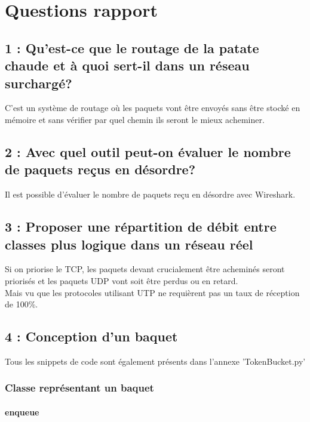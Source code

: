 \documentclass{article}
\begin{document}
\section{Questions rapport}

\subsection*{1 : Qu'est-ce que le routage de la patate chaude et à quoi sert-il dans un réseau surchargé?}

C'est un système de routage où les paquets vont être envoyés sans être stocké en mémoire et sans vérifier par quel chemin ils seront le mieux acheminer. \cite{HotPotato}

\subsection*{2 : Avec quel outil peut-on évaluer le nombre de paquets reçus en désordre?}

Il est possible d'évaluer le nombre de paquets reçu en désordre avec Wireshark.


\subsection*{3 : Proposer une répartition de débit entre classes plus logique dans un réseau réel}

Si on priorise le TCP, les paquets devant crucialement être acheminés seront priorisés et les paquets UDP vont soit être perdus ou en retard. \\

Mais vu que les protocoles utilisant UTP ne requièrent pas un taux de réception de 100\%. 

\subsection*{4 : Conception d'un baquet}

Tous les snippets de code sont également présents dans l'annexe 'TokenBucket.py'

\subsubsection{Classe représentant un baquet}

\paragraph{enqueue}
\end{document}
